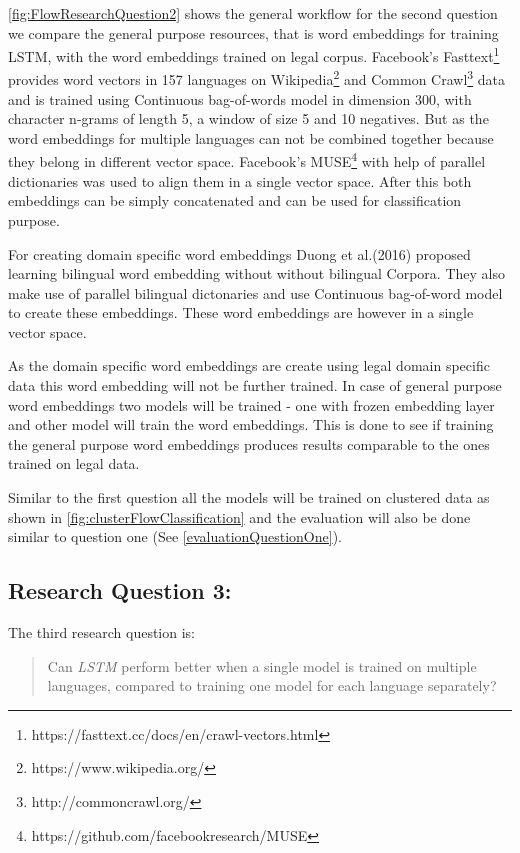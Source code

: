 \ref{fig:FlowResearchQuestion2} shows the general workflow for the second question we compare the general purpose resources, that is word embeddings for training LSTM, with the word embeddings trained on legal corpus. Facebook's Fasttext\footnote{https://fasttext.cc/docs/en/crawl-vectors.html}\cite{graves2009novel} provides word vectors in 157 languages on Wikipedia\footnote{https://www.wikipedia.org/} and Common Crawl\footnote{http://commoncrawl.org/} data and is trained using Continuous bag-of-words model in dimension 300, with character n-grams of length 5, a window of size 5 and 10 negatives. But as the word embeddings for multiple languages can not be combined together because they belong in different vector space. Facebook's MUSE\footnote{https://github.com/facebookresearch/MUSE} \cite{conneau2017word} with help of parallel dictionaries was used to align them in a single vector space. After this both embeddings can be simply concatenated and can be used for classification purpose. 

For creating domain specific word embeddings Duong et al.(2016)\cite{duong-EtAl:2016:EMNLP} proposed learning bilingual word embedding without without bilingual Corpora\cite{duong-EtAl:2016:EMNLP}. They also make use of parallel bilingual dictonaries and use Continuous bag-of-word model to create these embeddings. These word embeddings are however in a single vector space.

As the domain specific word embeddings are create using legal domain specific data this word embedding will not be further trained. In case of general purpose word embeddings two models will be trained - one with frozen embedding layer and other model will train the word embeddings. This is done to see if training the general purpose word embeddings produces results comparable to the ones trained on legal data.

Similar to the first question all the models will be trained on clustered data as shown in \ref{fig:clusterFlowClassification} and the evaluation will also be done similar to question one (See \ref{evaluationQuestionOne}).

\subsection{Research Question 3:} \label{question3}

The third research question is:

\begin{quote}
    Can \textit{LSTM} perform better  when a single model is trained on multiple languages, compared to training one model for each language separately?
\end{quote}

